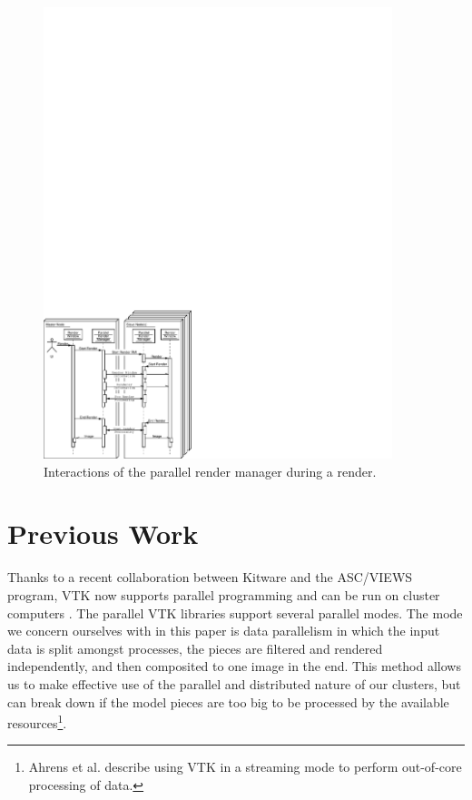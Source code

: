 \documentclass[letterpaper]{acmsiggraph}
\begin{document}
  \begin{figure}
    \begin{center}
      \includegraphics[width=4in]
		      {images/ParallelRenderManagerInteraction}
    \end{center}
    \caption{Interactions of the parallel render manager during a render.}
    \label{fig:parallel_render_manager_interaction}
  \end{figure}


  \section{Previous Work}
  \label{sec:previous_work}

  Thanks to a recent collaboration between Kitware and the ASC/VIEWS
  program, VTK now supports parallel programming and can be run on cluster
  computers \cite{Ahrens00}.  The parallel VTK libraries support several
  parallel modes.  The mode we concern ourselves with in this paper is data
  parallelism in which the input data is split amongst processes, the
  pieces are filtered and rendered independently, and then composited to
  one image in the end.  This method allows us to make effective use of the
  parallel and distributed nature of our clusters, but can break down if
  the model pieces are too big to be processed by the available
  resources\footnote{Ahrens et al. \cite{Ahrens01} describe using VTK in a
  streaming mode to perform out-of-core processing of data.}.
\end{document}
